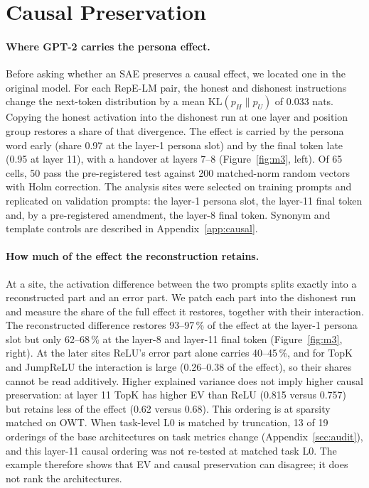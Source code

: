 \section{Causal Preservation}\label{sec:causal}

\paragraph{Where GPT-2 carries the persona effect.} Before asking whether an SAE preserves a causal effect, we
located one in the original model. For each RepE-LM pair, the honest and dishonest instructions change the next-token
distribution by a mean $\mathrm{KL}(p_H\|p_U)$ of 0.033 nats. Copying the honest activation into the dishonest run at
one layer and position group restores a share of that divergence. The effect is carried by the persona word early
(share 0.97 at the layer-1 persona slot) and by the final token late (0.95 at layer 11), with a handover at layers 7--8
(Figure~\ref{fig:m3}, left). Of 65 cells, 50 pass the pre-registered test against 200 matched-norm random vectors with
Holm correction. The analysis sites were selected on training prompts and replicated on validation prompts: the layer-1
persona slot, the layer-11 final token and, by a pre-registered amendment, the layer-8 final token. Synonym and template
controls are described in Appendix~\ref{app:causal}.

\paragraph{How much of the effect the reconstruction retains.} At a site, the activation difference between the two
prompts splits exactly into a reconstructed part and an error part. We patch each part into the dishonest run and
measure the share of the full effect it restores, together with their interaction. The reconstructed difference
restores 93--97\,\% of the effect at the layer-1 persona slot but only 62--68\,\% at the layer-8 and layer-11 final token
(Figure~\ref{fig:m3}, right). At the later sites ReLU's error part alone carries 40--45\,\%, and for TopK and JumpReLU the
interaction is large (0.26--0.38 of the effect), so their shares cannot be read additively. Higher explained variance
does not imply higher causal preservation: at layer 11 TopK has higher EV than ReLU (0.815 versus 0.757) but retains
less of the effect (0.62 versus 0.68). This ordering is at sparsity matched on OWT. When task-level L0 is matched by
truncation, 13 of 19 orderings of the base architectures on task metrics change (Appendix~\ref{sec:audit}), and this
layer-11 causal ordering was not re-tested at matched task L0. The example therefore shows that EV and causal
preservation can disagree; it does not rank the architectures.

